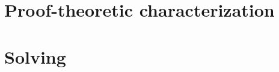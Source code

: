 \documentclass{article}
\begin{document}
\begin{refsection}
  \nocite{gekakasc12a}
  \nocite{lifschitz08a,lifschitz10a}
  \nocite{fitting02a}
  \nocite{fitting85a}
  \nocite{truszczynski18a}
  \nocite{lifschitz08a,lifschitz10a}
  \nocite{gerosc91a}
  \nocite{saczan90a,lee05a}
  \nocite{gerosc91a}
  \nocite{truszczynski18a}
  \printbibliography[heading=subbibliography]
\end{refsection}

\section{Proof-theoretic characterization}

\begin{refsection}
  \nocite{gekakasc12a}
  \nocite{lifschitz08a,lifschitz10a}
  \nocite{lifschitz08a,lifschitz10a}
  \nocite{TableauHandbook}

  \printbibliography[heading=subbibliography]
\end{refsection}

\section{Solving}

\begin{refsection}
  \nocite{gekasc09c}
  \nocite{lifschitz08a,lifschitz10a}
  \printbibliography[heading=subbibliography]
\end{refsection}
\end{document}
